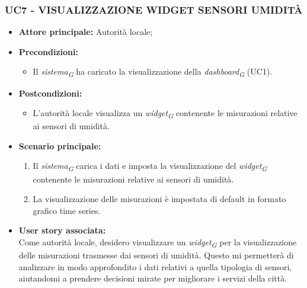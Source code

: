 \subsubsection{UC7 - VISUALIZZAZIONE WIDGET SENSORI UMIDITÀ}
\begin{itemize}
    \item \textbf{Attore principale:} Autorità locale;
    \item \textbf{Precondizioni:}
        \begin{itemize}
            \item Il \textit{sistema}\textsubscript{\textit{G}} ha caricato la visualizzazione della \textit{dashboard}\textsubscript{\textit{G}} (UC1).
        \end{itemize}
    \item \textbf{Postcondizioni:}
        \begin{itemize}
            \item L'autorità locale visualizza un \textit{widget}\textsubscript{\textit{G}} contenente le misurazioni relative ai sensori di umidità.
        \end{itemize}
        \item \textbf{Scenario principale:}
        \begin{enumerate}
            \item Il \textit{sistema}\textsubscript{\textit{G}} carica i dati e imposta la visualizzazione del \textit{widget}\textsubscript{\textit{G}} contenente le misurazioni relative ai sensori di umidità.
            \item La visualizzazione delle misurazioni è impostata di default in formato grafico time series.
        \end{enumerate}
    \item \textbf{User story associata:} \\
        Come autorità locale, desidero visualizzare un \textit{widget}\textsubscript{\textit{G}} per la visualizzazione delle misurazioni trasmesse dai sensori di umidità. Questo mi permetterà di analizzare in modo approfondito i dati relativi a quella tipologia di sensori, aiutandomi a prendere decisioni mirate per migliorare i servizi della città.
\end{itemize}